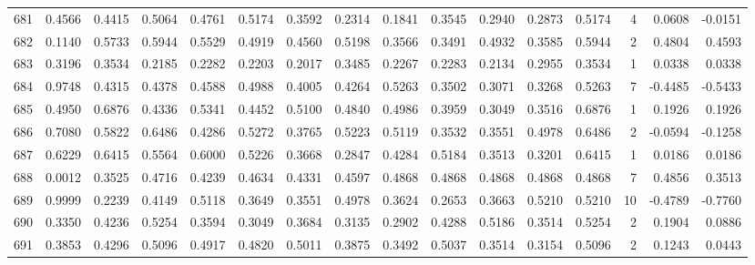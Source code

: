 \begin{tabular}{lrrrrrrrrrrrrrrr}
681 &      0.4566 &  0.4415 &  0.5064 &  0.4761 &  0.5174 &  0.3592 &  0.2314 &  0.1841 &  0.3545 &  0.2940 &   0.2873 &     0.5174 &      4 &                    0.0608 &                    -0.0151 \\
682 &      0.1140 &  0.5733 &  0.5944 &  0.5529 &  0.4919 &  0.4560 &  0.5198 &  0.3566 &  0.3491 &  0.4932 &   0.3585 &     0.5944 &      2 &                    0.4804 &                     0.4593 \\
683 &      0.3196 &  0.3534 &  0.2185 &  0.2282 &  0.2203 &  0.2017 &  0.3485 &  0.2267 &  0.2283 &  0.2134 &   0.2955 &     0.3534 &      1 &                    0.0338 &                     0.0338 \\
684 &      0.9748 &  0.4315 &  0.4378 &  0.4588 &  0.4988 &  0.4005 &  0.4264 &  0.5263 &  0.3502 &  0.3071 &   0.3268 &     0.5263 &      7 &                   -0.4485 &                    -0.5433 \\
685 &      0.4950 &  0.6876 &  0.4336 &  0.5341 &  0.4452 &  0.5100 &  0.4840 &  0.4986 &  0.3959 &  0.3049 &   0.3516 &     0.6876 &      1 &                    0.1926 &                     0.1926 \\
686 &      0.7080 &  0.5822 &  0.6486 &  0.4286 &  0.5272 &  0.3765 &  0.5223 &  0.5119 &  0.3532 &  0.3551 &   0.4978 &     0.6486 &      2 &                   -0.0594 &                    -0.1258 \\
687 &      0.6229 &  0.6415 &  0.5564 &  0.6000 &  0.5226 &  0.3668 &  0.2847 &  0.4284 &  0.5184 &  0.3513 &   0.3201 &     0.6415 &      1 &                    0.0186 &                     0.0186 \\
688 &      0.0012 &  0.3525 &  0.4716 &  0.4239 &  0.4634 &  0.4331 &  0.4597 &  0.4868 &  0.4868 &  0.4868 &   0.4868 &     0.4868 &      7 &                    0.4856 &                     0.3513 \\
689 &      0.9999 &  0.2239 &  0.4149 &  0.5118 &  0.3649 &  0.3551 &  0.4978 &  0.3624 &  0.2653 &  0.3663 &   0.5210 &     0.5210 &     10 &                   -0.4789 &                    -0.7760 \\
690 &      0.3350 &  0.4236 &  0.5254 &  0.3594 &  0.3049 &  0.3684 &  0.3135 &  0.2902 &  0.4288 &  0.5186 &   0.3514 &     0.5254 &      2 &                    0.1904 &                     0.0886 \\
691 &      0.3853 &  0.4296 &  0.5096 &  0.4917 &  0.4820 &  0.5011 &  0.3875 &  0.3492 &  0.5037 &  0.3514 &   0.3154 &     0.5096 &      2 &                    0.1243 &                     0.0443 \\

\end{tabular}
